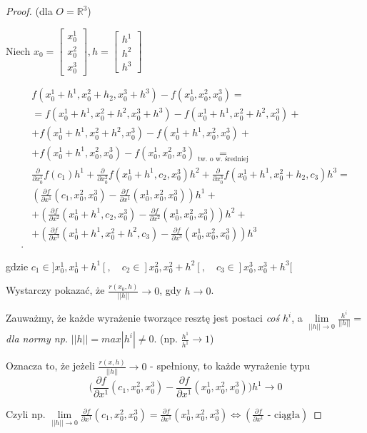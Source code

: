 \documentclass[../main.tex]{subfiles}
\begin{document}
\begin{proof}
    (dla $O=\mathbb{R}^3$)

    Niech $x_0 = \left [ \begin{matrix}
        x_0^1\\
        x_0^2\\
        x_0^3
    \end{matrix}
    \right ], h = \left [ \begin{matrix}
        h^1\\
        h^2\\
        h^3
    \end{matrix} \right ]$

    \begin{align*}
        &f(x_0^1+h^1,x_0^2+h_2,x_0^3+h^3)-f(x_0^1,x_0^2,x_0^3)=\\
        &=f(x_0^1+h^1,x_0^2+h^2,x_0^3+h^3)-f(x_0^1+h^1,x_0^2+h^2,x_0^3)+\\
        &+f(x_0^1+h^1,x_0^2+h^2,x_0^3)-f(x_0^1+h^1,x_0^2,x_0^3)+\\
        &+f(x_0^1+h^1,x_0^2,x_0^3)-f(x_0^1,x_0^2,x_0^3) \underset{\text{tw. o w. średniej}}{=}\\
        &\frac{\partial}{\partial x_0^1} f (c_1)h^1 + \frac{\partial}{\partial x_0^2} f (x_0^1+h^1,c_2,x_0^3)h^2+\frac{\partial}{\partial x_0^3} f (x_0^1+h^1,x_0^2+h_2,c_3)h^3=\\
        &(\frac{\partial f}{\partial x^1} (c_1,x_0^2,x_0^3) - \frac{\partial f}{\partial x^1} (x_0^1,x_0^2,x_0^3))h^1 +\\
        &+ (\frac{\partial f}{\partial x^2} (x_0^1 + h^1, c_2, x_0^3) - \frac{\partial f}{\partial x^2} (x_0^1, x_0^2, x_0^3))h^2 +\\
        &+ (\frac{\partial f}{\partial x^3} (x_0^1+h^1,x_0^2+h^2,c_3) - \frac{\partial f}{\partial x^3} (x_0^1, x_0^2, x_0^3))h^3\\
    .\end{align*}

    gdzie $c_1\in ]x_0^1,x_0^1+h^1[,\quad c_2\in ]x_0^2,x_0^2+h^2[,\quad c_3\in ]x_0^3,x_0^3+h^3[$

    Wystarczy pokazać, że $\frac{r(x_0,h)}{||h||}\to 0$, gdy $h\to 0$.

    Zauważmy, że każde wyrażenie tworzące resztę jest postaci \textit{coś} $h^i$, a $\lim\limits_{||h|| \to 0}\frac{h^i}{||h||} =$ \textit{dla normy np.} $||h|| = max{|h^i|}\neq 0$.
    (np. $\frac{h^1}{h^1} \to 1$)

    Oznacza to, że jeżeli $\frac{r(x,h)}{||h||}\to 0$ - spełniony, to każde wyrażenie typu
    $$ \Big ( \frac{\partial f}{\partial x^1} (c_1,x_0^2,x_0^3) - \frac{\partial f}{\partial x^1} (x_0^1,x_0^2,x_0^3)\Big ) h^1 \to 0$$

    Czyli np. $\lim\limits_{||h|| \to 0}\frac{\partial f}{\partial x^1} (c_1,x_0^2,x_0^3) = \frac{\partial f}{\partial x^1} (x_0^1,x_0^2,x_0^3) \iff (\frac{\partial f}{\partial x^1}  \text{ - ciągła} )$
\end{proof}
\end{document}
